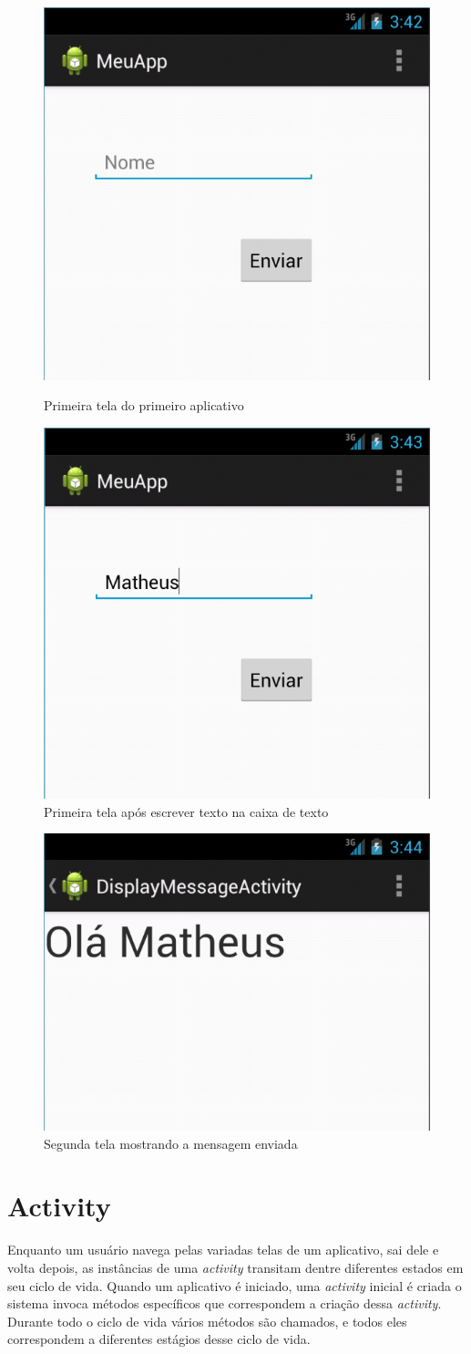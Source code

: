 \documentclass[a4paper,12pt,brazil]{book}
\begin{document}
\begin{singlespace}
\begin{figure}[H]
  \centering
  \includegraphics[width=.4\textwidth]{figuras/6-criando-app.png}
  \caption{Primeira tela do primeiro aplicativo}
  \label{fig:1tela}
  \includegraphics[width=.4\textwidth]{figuras/7-criando-app.png}
  \caption{Primeira tela após escrever texto na caixa de texto}
  \label{fig:1tela2}
\end{figure}
\begin{figure}[H]
  \centering
  \includegraphics[width=.4\textwidth]{figuras/8-criando-app.png}
  \caption{Segunda tela mostrando a mensagem enviada}
  \label{fig:2tela}
\end{figure}


\section{Activity}
Enquanto um usuário navega pelas variadas telas de um aplicativo, sai dele e volta depois, as instâncias de uma \emph{activity} transitam dentre diferentes estados em seu ciclo de vida. Quando um aplicativo é iniciado, uma \emph{activity} inicial é criada o sistema invoca métodos específicos que correspondem a criação dessa \emph{activity}. Durante todo o ciclo de vida vários métodos são chamados, e todos eles correspondem a diferentes estágios desse ciclo de vida. 


\end{singlespace}
\end{document}
